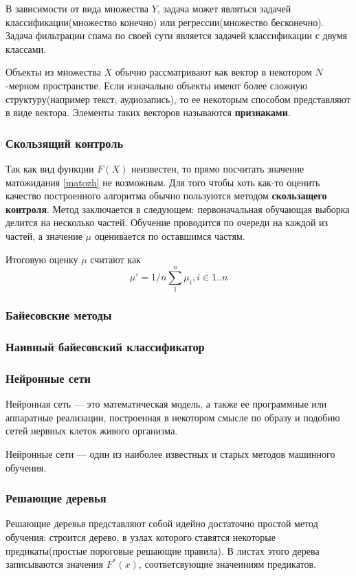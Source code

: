 В зависимости от вида множества $Y$, задача может являться задачей классификации(множество конечно) или регрессии(множество бесконечно).
Задача фильтрации спама по своей сути является задачей классификации с двумя классами.

Объекты из множества $X$ обычно рассматривают как вектор в некотором $N$-мерном пространстве. Если изначально объекты имеют более сложную структуру(например текст, аудиозапись), то ее некоторым способом представляют в виде вектора. Элементы таких векторов называются \textbf{признаками}.

\subsubsection{Скользящий контроль}
Так как вид функции $F(X)$  неизвестен, то прямо посчитать значение матожидания \ref{matozh} не возможным. Для того чтобы хоть как-то оценить качество построенного алгоритма обычно пользуются методом \textbf{скользащего контроля}. Метод заключается в следующем: первоначальная обучающая выборка делится на несколько частей. Обучение проводится по очереди на каждой из частей, а значение $\mu$ оценивается по оставшимся частям.

Итоговую оценку $\mu$ считают как
\begin{equation}
\mu' = 1/n\sum_1^n{\mu_i}, i \in 1..n
\end{equation}

\subsubsection{Байесовские методы}
\label{bayes}
\subsubsection{Наивный байесовский классификатор}
\subsubsection{Нейронные сети}
Нейронная сеть — это математическая модель, а также ее программные или аппаратные реализации, построенная в некотором смысле по образу и подобию сетей нервных клеток живого организма.

Нейронные сети — один из наиболее известных и старых методов машинного обучения.

\subsubsection{Решающие деревья}
Решающие деревья представляют собой идейно достаточно простой метод обучения: строится дерево, в узлах которого ставятся некоторые предикаты(простые пороговые решающие правила). В листах этого дерева записываются значения $F^*(x)$, соответсвующие значеиниям предикатов.

